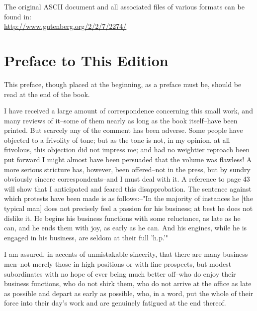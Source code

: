 \noindent The original ASCII document and all associated files of
various formats can be found in:\\
\href{http://www.gutenberg.org/2/2/7/2274/}{http://www.gutenberg.org/2/2/7/2274/}
\clearpage

\thispagestyle{ruled}
\pagestyle{ruled}

\setlength{\parskip}{0em}
\tableofcontents*

\setlength{\parskip}{0em}

\clearpage

\normalsize

\setcounter{chapter}{1}
\chapter*{Preface to This Edition}

This preface, though placed at the beginning, as a preface must be,
should be read at the end of the book.

I have received a large amount of correspondence concerning this small
work, and many reviews of it--some of them nearly as long as the book
itself--have been printed.  But scarcely any of the comment has been
adverse.  Some people have objected to a frivolity of tone; but as the
tone is not, in my opinion, at all frivolous, this objection did not
impress me; and had no weightier reproach been put forward I might
almost have been persuaded that the volume was flawless!  A more
serious stricture has, however, been offered--not in the press, but by
sundry obviously sincere correspondents--and I must deal with it.  A
reference to page 43 will show that I anticipated and feared this
disapprobation.  The sentence against which protests have been made is
as follows:--"In the majority of instances he [the typical man] does
not precisely feel a passion for his business; at best he does not
dislike it.  He begins his business functions with some reluctance, as
late as he can, and he ends them with joy, as early as he can. And his
engines, while he is engaged in his business, are seldom at their full
'h.p.'"

I am assured, in accents of unmistakable sincerity, that there are many
business men--not merely those in high positions or with fine
prospects, but modest subordinates with no hope of ever being much
better off--who do enjoy their business functions, who do not shirk
them, who do not arrive at the office as late as possible and depart as
early as possible, who, in a word, put the whole of their force into
their day's work and are genuinely fatigued at the end thereof.

